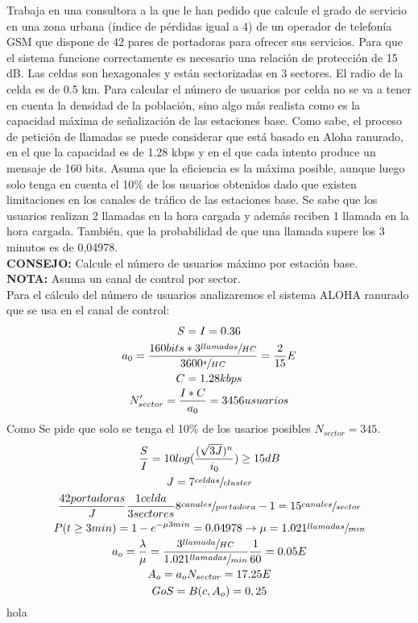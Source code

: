 \begin{exercise}[5]
	Trabaja en una consultora a la que le han pedido que calcule el grado de servicio en una zona urbana (índice de pérdidas igual a 4) de un operador de telefonía GSM que dispone de 42 pares de portadoras para ofrecer sus servicios. Para que el sistema funcione correctamente es necesario una relación de protección de 15 dB. Las celdas son hexagonales y están sectorizadas en 3 sectores. El radio de la celda es de 0.5 km. Para calcular el número de usuarios por celda no se va a tener en cuenta la densidad de la población, sino algo más realista como es la capacidad máxima de señalización de las estaciones base. Como sabe, el proceso de petición de llamadas se puede considerar que está basado en Aloha ranurado, en el que la capacidad es de 1.28 kbps y en el que cada intento produce un mensaje de 160 bits. Asuma que la eficiencia es la máxima posible, aunque luego solo tenga en cuenta el 10\% de los usuarios obtenidos dado que existen limitaciones en los canales de tráfico de las estaciones base. Se sabe que los usuarios realizan 2 llamadas en la hora cargada y además reciben 1 llamada en la hora cargada. También, que la probabilidad de que una llamada supere los 3 minutos es de 0,04978.\\ 
	\textbf{CONSEJO:} Calcule el número de usuarios máximo por estación base. \\
	\textbf{NOTA:} Asuma un canal de control por sector.\\
	Para el cálculo del número de usuarios analizaremos el sistema ALOHA ranurado que se usa en el canal de control:
	\begin{gather*}
		S=I=0.36\\
		a_0=\frac{160bits*3\sfrac{llamadas}{HC}}{3600\sfrac{s}{HC}}=\frac{2}{15}E\\
		C=1.28kbps\\
		N'_{sector}=\frac{I*C}{a_0}=3456usuarios
	\end{gather*}
	Como Se pide que solo se tenga el 10\% de los usarios posibles $N_{sector}=345$. 
	\begin{gather*}
		\frac{S}{I}=10log(\frac{(\sqrt{3J})^n}{i_0})\geq 15dB\\
		J=7\sfrac{celdas}{cluster}\\
		\frac{42portadoras}{J}\frac{1celda}{3sectores}8\sfrac{canales}{portadora}-1=15\sfrac{canales}{sector}\\
		P(t\geq 3min)=1-e^{-\mu 3min}=0.04978 \to \mu=1.021\sfrac{llamadas}{min}\\
		a_o=\frac{\lambda}{\mu}=\frac{3\sfrac{llamada}{HC}}{1.021\sfrac{llamadas}{min}}\frac{1}{60}=0.05E\\
		A_o=a_o N_{sector}=17.25E\\
		GoS=B(c,A_o)=0,25
	\end{gather*}
	hola
\end{exercise}

